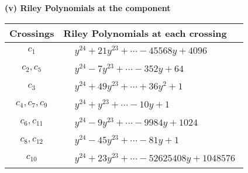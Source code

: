 \documentclass[1p]{elsarticle_modified}
\theoremstyle{definition}
\begin{document}
\flushleft \textbf{(v) Riley Polynomials at the component}\newline \\
\begin{tabular}{m{50pt}|m{274pt}}
Crossings & \hspace{64pt}Riley Polynomials at each crossing \\
\hline $$\begin{aligned}c_{1}\end{aligned}$$&$\begin{aligned}
&y^{24}+21 y^{23}+\cdots-45568 y+4096
\end{aligned}$\\
\hline $$\begin{aligned}c_{2},c_{5}\end{aligned}$$&$\begin{aligned}
&y^{24}-7 y^{23}+\cdots-352 y+64
\end{aligned}$\\
\hline $$\begin{aligned}c_{3}\end{aligned}$$&$\begin{aligned}
&y^{24}+49 y^{23}+\cdots+36 y^2+1
\end{aligned}$\\
\hline $$\begin{aligned}c_{4},c_{7},c_{9}\end{aligned}$$&$\begin{aligned}
&y^{24}+y^{23}+\cdots-10 y+1
\end{aligned}$\\
\hline $$\begin{aligned}c_{6},c_{11}\end{aligned}$$&$\begin{aligned}
&y^{24}-9 y^{23}+\cdots-9984 y+1024
\end{aligned}$\\
\hline $$\begin{aligned}c_{8},c_{12}\end{aligned}$$&$\begin{aligned}
&y^{24}-45 y^{23}+\cdots-81 y+1
\end{aligned}$\\
\hline $$\begin{aligned}c_{10}\end{aligned}$$&$\begin{aligned}
&y^{24}+23 y^{23}+\cdots-52625408 y+1048576
\end{aligned}$\\
\hline
\end{tabular}\\~\\
\end{document}
